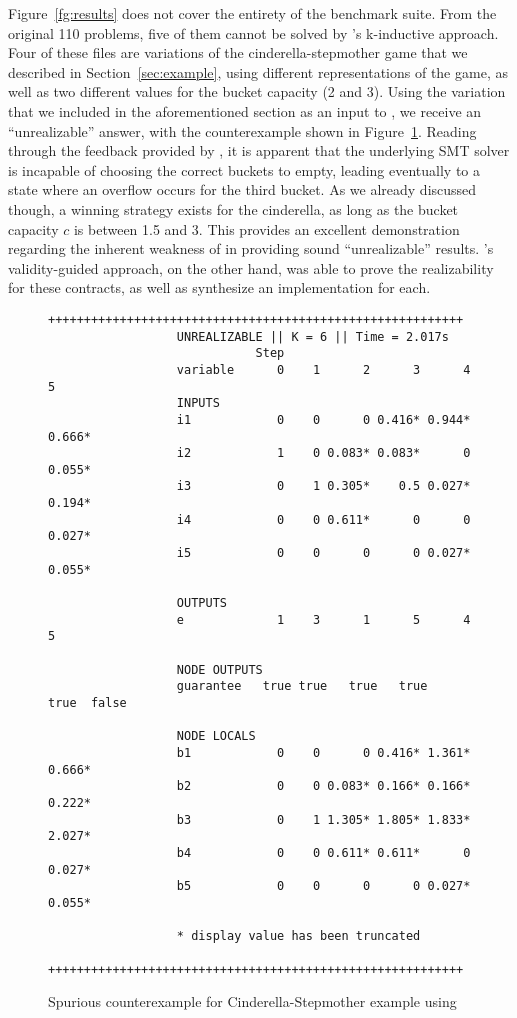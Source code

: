 
Figure~\ref{fg:results} does not cover the entirety of the
benchmark suite. From the original 110 problems, five of them cannot be
solved by \jsyn's k-inductive approach. Four of these files are variations of
the cinderella-stepmother game that we described in Section~\ref{sec:example}, using different representations of the game, as well as two different values
for the bucket capacity (2 and 3). Using the variation that we included in the
aforementioned section as an input to \jsyn, we receive an ``unrealizable'' answer, with the counterexample shown
in Figure~\ref{fg:cex}. Reading through the feedback provided by \jsyn, it is
apparent that the underlying SMT solver is incapable of choosing the correct
buckets to empty, leading eventually to a state where an overflow occurs for the
third bucket. As we already discussed though, a winning strategy exists for the
cinderella, as long as the bucket capacity $c$ is between 1.5 and 3. This
provides an excellent demonstration regarding the inherent weakness of \jsyn
in providing sound ``unrealizable'' results. \jsynvg's validity-guided approach,
on the other hand, was able to prove the realizability for these contracts, as
well as synthesize an implementation for each.

\begin{figure}[!t]
 \begin{Verbatim}[fontsize=\tiny]
			 ++++++++++++++++++++++++++++++++++++++++++++++++++++++++++
			      UNREALIZABLE || K = 6 || Time = 2.017s
			                 Step
			      variable      0    1      2      3      4      5
			      INPUTS
			      i1            0    0      0 0.416* 0.944* 0.666*
			      i2            1    0 0.083* 0.083*      0 0.055*
			      i3            0    1 0.305*    0.5 0.027* 0.194*
			      i4            0    0 0.611*      0      0 0.027*
			      i5            0    0      0      0 0.027* 0.055*
			
			      OUTPUTS
			      e             1    3      1      5      4      5
			
			      NODE OUTPUTS
			      guarantee   true true   true   true   true  false
			
			      NODE LOCALS
			      b1            0    0      0 0.416* 1.361* 0.666*
			      b2            0    0 0.083* 0.166* 0.166* 0.222*
			      b3            0    1 1.305* 1.805* 1.833* 2.027*
			      b4            0    0 0.611* 0.611*      0 0.027*
			      b5            0    0      0      0 0.027* 0.055*
			
			      * display value has been truncated
			 ++++++++++++++++++++++++++++++++++++++++++++++++++++++++++
 \end{Verbatim}
\caption{Spurious counterexample for Cinderella-Stepmother example using \jsyn}

\label{fg:cex}
\end{figure}

